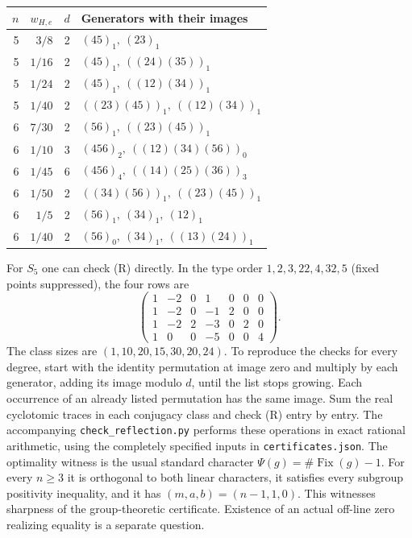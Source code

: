 \begin{center}\small
\begin{tabular}{r r r l}
\hline
$n$ & $w_{H,e}$ & $d$ & Generators with their images\\ \hline
5 & $3/8$&2 & $(45)_1,\ (23)_1$\\
5 & $1/16$&2 & $(45)_1,\ ((24)(35))_1$\\
5 & $1/24$&2 & $(45)_1,\ ((12)(34))_1$\\
5 & $1/40$&2 & $((23)(45))_1,\ ((12)(34))_1$\\ \hline
6 & $7/30$&2 & $(56)_1,\ ((23)(45))_1$\\
6 & $1/10$&3 & $(456)_2,\ ((12)(34)(56))_0$\\
6 & $1/45$&6 & $(456)_4,\ ((14)(25)(36))_3$\\
6 & $1/50$&2 & $((34)(56))_1,\ ((23)(45))_1$\\
6 & $1/5$&2 & $(56)_1,\ (34)_1,\ (12)_1$\\
6 & $1/40$&2 & $(56)_0,\ (34)_1,\ ((13)(24))_1$\\ \hline
\end{tabular}
\end{center}

For $S_5$ one can check (R) directly. In the type order
$1,2,3,22,4,32,5$ (fixed points suppressed), the four rows are
\[
\begin{pmatrix}
1&-2&0&1&0&0&0\\
1&-2&0&-1&2&0&0\\
1&-2&2&-3&0&2&0\\
1&0&0&-5&0&0&4
\end{pmatrix}.
\]
The class sizes are $(1,10,20,15,30,20,24)$.
To reproduce the checks for every degree, start with the identity
permutation at image zero and multiply by each generator, adding its
image modulo $d$, until the list stops growing. Each occurrence of an
already listed permutation has the same image. Sum the real cyclotomic
traces in each conjugacy class and check (R) entry by entry. The
accompanying \texttt{check\_reflection.py} performs these operations in
exact rational arithmetic, using the completely specified inputs in
\texttt{certificates.json}. The optimality witness is the usual standard
character $\Psi(g)=\#\operatorname{Fix}(g)-1$. For every $n\ge3$ it is
orthogonal to both linear characters, it satisfies every subgroup
positivity inequality, and it has $(m,a,b)=(n-1,1,0)$. This witnesses
sharpness of the group-theoretic certificate. Existence of an actual
off-line zero realizing equality is a separate question.

